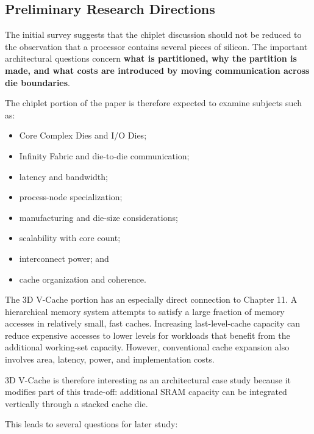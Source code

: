 \documentclass[12pt,a4paper,twoside]{article}
\begin{document}
\subsection{Preliminary Research Directions}
\label{sec:directions}

The initial survey suggests that the chiplet discussion should not be reduced to the observation that a processor contains several pieces of silicon. The important architectural questions concern \textbf{what is partitioned, why the partition is made, and what costs are introduced by moving communication across die boundaries}.

The chiplet portion of the paper is therefore expected to examine subjects such as:

\begin{itemize}
  \item Core Complex Dies and I/O Dies;
  \item Infinity Fabric and die-to-die communication;
  \item latency and bandwidth;
  \item process-node specialization;
  \item manufacturing and die-size considerations;
  \item scalability with core count;
  \item interconnect power; and
  \item cache organization and coherence.
\end{itemize}

The 3D V-Cache portion has an especially direct connection to Chapter 11. A hierarchical memory system attempts to satisfy a large fraction of memory accesses in relatively small, fast caches. Increasing last-level-cache capacity can reduce expensive accesses to lower levels for workloads that benefit from the additional working-set capacity. However, conventional cache expansion also involves area, latency, power, and implementation costs.

3D V-Cache is therefore interesting as an architectural case study because it modifies part of this trade-off: additional SRAM capacity can be integrated vertically through a stacked cache die.

This leads to several questions for later study:
\end{document}
